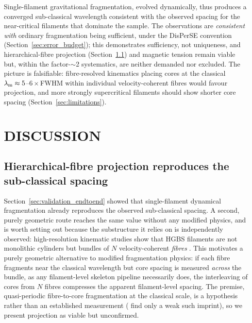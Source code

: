 \documentclass[usenatbib,twoside,twocolumn]{mnras}
\begin{document}
Single-filament gravitational fragmentation, evolved dynamically, thus produces a converged sub-classical wavelength consistent with the observed spacing for the near-critical filaments that dominate the sample. The observations are \emph{consistent with} ordinary fragmentation being sufficient, under the DisPerSE convention (Section~\ref{sec:error_budget}); this demonstrates sufficiency, not uniqueness, and hierarchical-fibre projection (Section~\ref{sec:fibre_projection}) and magnetic tension remain viable but, within the factor-$\sim$2 systematics, are neither demanded nor excluded. The picture is falsifiable: fibre-resolved kinematics placing cores at the classical $\lambda_{\rm m}\approx5$--$6\times$FWHM within individual velocity-coherent fibres would favour projection, and more strongly supercritical filaments should show shorter core spacing (Section~\ref{sec:limitations}).

\section{DISCUSSION}
\label{sec:discussion}

\subsection{Hierarchical-fibre projection reproduces the sub-classical spacing}
\label{sec:fibre_projection}

Section~\ref{sec:validation_endtoend} showed that single-filament dynamical fragmentation already reproduces the observed sub-classical spacing. A second, purely geometric route reaches the same value without any modified physics, and is worth setting out because the substructure it relies on is independently observed: high-resolution kinematic studies show that HGBS filaments are not monolithic cylinders but bundles of $N$ velocity-coherent \emph{fibres} \citep{Hacar2013,Hacar2018,Yang2024}. This motivates a purely geometric alternative to modified fragmentation physics: if each fibre fragments near the classical wavelength but core spacing is measured \emph{across} the bundle, as any filament-level skeleton pipeline necessarily does, the interleaving of cores from $N$ fibres compresses the apparent filament-level spacing. The premise, quasi-periodic fibre-to-core fragmentation at the classical scale, is a hypothesis rather than an established measurement (\citealt{Yang2024} find only a weak such imprint), so we present projection as viable but unconfirmed.
\end{document}
